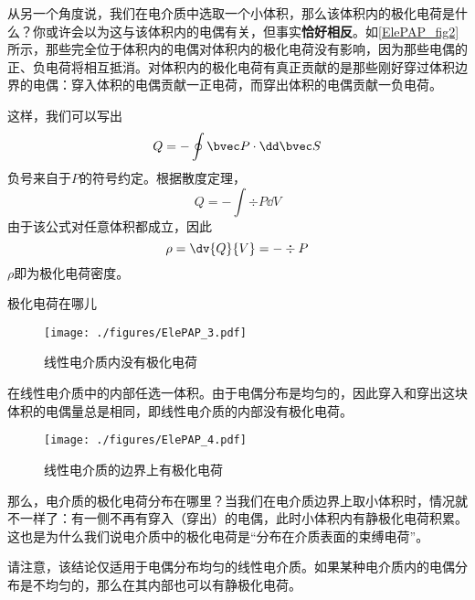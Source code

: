 从另一个角度说，我们在电介质中选取一个小体积，那么该体积内的极化电荷是什么？你或许会以为这与该体积内的电偶有关，但事实\textbf{恰好相反}。如\autoref{ElePAP_fig2} 所示，那些完全位于体积内的电偶对体积内的极化电荷没有影响，因为那些电偶的正、负电荷将相互抵消。对体积内的极化电荷有真正贡献的是那些刚好穿过体积边界的电偶：穿入体积的电偶贡献一正电荷，而穿出体积的电偶贡献一负电荷。

这样，我们可以写出
$$
Q= - \oint \bvec P \cdot \dd \bvec S
$$
负号来自于$P$的符号约定。根据散度定理，
$$
Q= - \int \div P \dd V
$$
由于该公式对任意体积都成立，因此
\begin{equation}
\rho = \dv{Q}{V}= - \div P
\end{equation}
$\rho$即为极化电荷密度。

\begin{example}{极化电荷在哪儿}
\begin{figure}[ht]
\centering
\texttt{[image: ./figures/ElePAP\_3.pdf]}
\caption{线性电介质内没有极化电荷} \label{ElePAP_fig3}
\end{figure}

在线性电介质中的内部任选一体积。由于电偶分布是均匀的，因此穿入和穿出这块体积的电偶量总是相同，即线性电介质的内部没有极化电荷。

\begin{figure}[ht]
\centering
\texttt{[image: ./figures/ElePAP\_4.pdf]}
\caption{线性电介质的边界上有极化电荷} \label{ElePAP_fig4}
\end{figure}
那么，电介质的极化电荷分布在哪里？当我们在电介质边界上取小体积时，情况就不一样了：有一侧不再有穿入（穿出）的电偶，此时小体积内有静极化电荷积累。这也是为什么我们说电介质中的极化电荷是“分布在介质表面的束缚电荷”。

请注意，该结论仅适用于电偶分布均匀的线性电介质。如果某种电介质内的电偶分布是不均匀的，那么在其内部也可以有静极化电荷。
\end{example}
